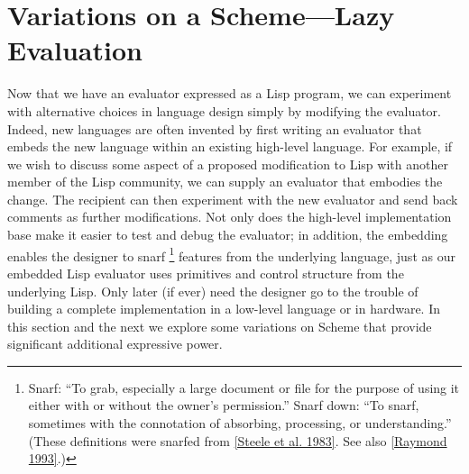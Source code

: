 \section{Variations on a Scheme---Lazy Evaluation}
\label{Section 4.2}

Now that we have an evaluator expressed as a Lisp program, we can experiment with alternative choices in language design simply by modifying the evaluator.
Indeed, new languages are often invented by first writing an evaluator that embeds the new language within an existing high-level language.
For example, if we wish to discuss some aspect of a proposed modification to Lisp with another member of the Lisp community, we can supply an evaluator that embodies the change.
The recipient can then experiment with the new evaluator and send back comments as further modifications.
Not only does the high-level implementation base make it easier to test and debug the evaluator;
in addition, the embedding enables the designer to snarf%
\footnote{
	Snarf:
	“To grab, especially a large document or file for the purpose of using it either with or without the owner’s permission.”
	Snarf down:
	“To snarf, sometimes with the connotation of absorbing, processing, or understanding.”
	(These definitions were snarfed from \cref{Steele et al. 1983}.
	See also \cref{Raymond 1993}.)
}
features from the underlying language, just as our embedded Lisp evaluator uses primitives and control structure from the underlying Lisp.
Only later (if ever) need the designer go to the trouble of building a complete implementation in a low-level language or in hardware.
In this section and the next we explore some variations on Scheme that provide significant additional expressive power.




